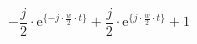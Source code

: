 \[
-\frac{j}{2} \cdot \textrm{e}^{ \{-j \cdot \frac{w}{2} \cdot t \}}
+\frac{j}{2} \cdot \textrm{e}^{ \{ j \cdot \frac{w}{2} \cdot t \}}
+1
\]
